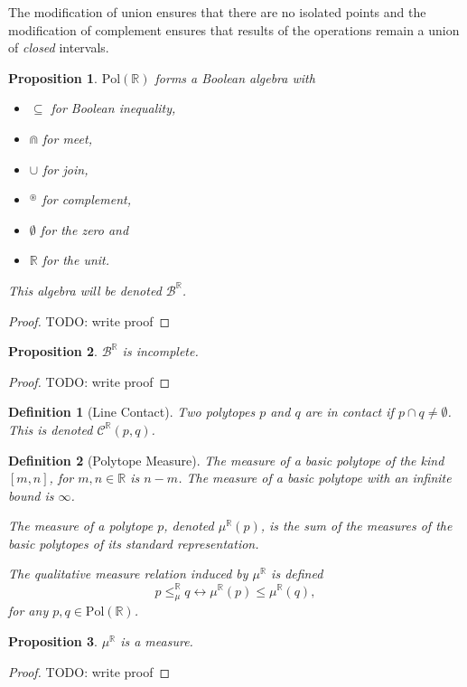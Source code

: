 \documentclass{article}
\newtheorem*{definition}{Definition}
\newtheorem*{proposition}{Proposition}
\newcommand{\R}{\mathbb{R}}
\newcommand{\B}{\mathcal{B}}
\newcommand{\bcup}{\cup}
\newcommand{\bcap}{\Cap}
\newcommand{\bstar}{^\circledast}
\newcommand{\bcont}{\mathcal{C}^\R}
\newcommand{\bmeasure}{\leq_\mu^\R}
\newcommand{\Pol}{\text{Pol}}
\begin{document}
The modification of union ensures that there are no isolated points and the modification of complement ensures that results of the operations remain a union of \emph{closed} intervals.

\begin{proposition}
$\Pol(\R)$ forms a Boolean algebra with
  \begin{itemize}
  \item $\subseteq$ for Boolean inequality,
  \item $\bcap$ for meet,
  \item $\bcup$ for join,
  \item $\bstar$ for complement,
  \item $\emptyset$ for the zero and
  \item $\R$ for the unit.
\end{itemize}
This algebra will be denoted $\B^\R$.
\end{proposition}
\begin{proof}
  TODO: write proof
\end{proof}

\begin{proposition}
  $\B^\R$ is incomplete.
\end{proposition}
\begin{proof}
  TODO: write proof
\end{proof}

\begin{definition}[Line Contact]
Two polytopes $p$ and $q$ are \emph{in contact} if $p \cap q \neq \emptyset$. This is denoted $\bcont(p, q)$.
\end{definition}

\begin{definition}[Polytope Measure]
  The measure of a basic polytope of the kind $[m, n]$, for $m, n \in \R$ is $n-m$. The measure of a basic polytope with an infinite bound is $\infty$.

  The \emph{measure} of a polytope $p$, denoted $\mu^\R(p)$, is the sum of the measures of the basic polytopes of its standard representation.

The \emph{qualitative measure relation induced by} $\mu^\R$ is defined
\begin{equation*}
  p \bmeasure q \longleftrightarrow \mu^\R(p) \leq \mu^\R(q),
\end{equation*}
  for any $p, q \in \Pol(\R)$.
\end{definition}

\begin{proposition}
  $\mu^\R$ is a measure.
\end{proposition}
\begin{proof}
  TODO: write proof
\end{proof}
\end{document}
